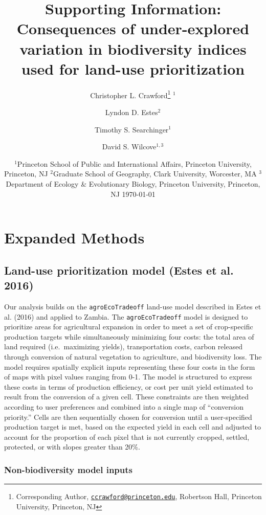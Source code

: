 \documentclass[
]{article}
\title{Supporting Information: Consequences of under-explored variation in biodiversity indices used for land-use prioritization}
\author{Christopher L. Crawford\footnote{Corresponding Author, \href{mailto:ccrawford@princeton.edu}{\nolinkurl{ccrawford@princeton.edu}}, Robertson Hall, Princeton University, Princeton, NJ} \(^1\) \and Lyndon D. Estes\(^2\) \and Timothy S. Searchinger\(^1\) \and David S. Wilcove\(^{1, 3}\)}
\date{\(^1\)Princeton School of Public and International Affairs, Princeton University, Princeton, NJ \newline \(^2\)Graduate School of Geography, Clark University, Worcester, MA \newline \(^3\)Department of Ecology \& Evolutionary Biology, Princeton University, Princeton, NJ \newline \newline \newline \today}
\begin{document}
\maketitle

{
\setcounter{tocdepth}{2}
\tableofcontents
}
\listoffigures

\hypertarget{expanded-methods}{%
\section{Expanded Methods}\label{expanded-methods}}

\hypertarget{land-use-prioritization-model-estes2016a}{%
\subsection{Land-use prioritization model (Estes et al. 2016)}\label{land-use-prioritization-model-estes2016a}}

Our analysis builds on the \texttt{agroEcoTradeoff} land-use model described in Estes et al. (2016) and applied to Zambia. The \texttt{agroEcoTradeoff} model is designed to prioritize areas for agricultural expansion in order to meet a set of crop-specific production targets while simultaneously minimizing four costs: the total area of land required (i.e.~maximizing yields), transportation costs, carbon released through conversion of natural vegetation to agriculture, and biodiversity loss. The model requires spatially explicit inputs representing these four costs in the form of maps with pixel values ranging from 0-1. The model is structured to express these costs in terms of production efficiency, or cost per unit yield estimated to result from the conversion of a given cell. These constraints are then weighted according to user preferences and combined into a single map of ``conversion priority.'' Cells are then sequentially chosen for conversion until a user-specified production target is met, based on the expected yield in each cell and adjusted to account for the proportion of each pixel that is not currently cropped, settled, protected, or with slopes greater than 20\%.

\hypertarget{non-bd-inputs}{%
\subsubsection{Non-biodiversity model inputs}\label{non-bd-inputs}}
\end{document}
